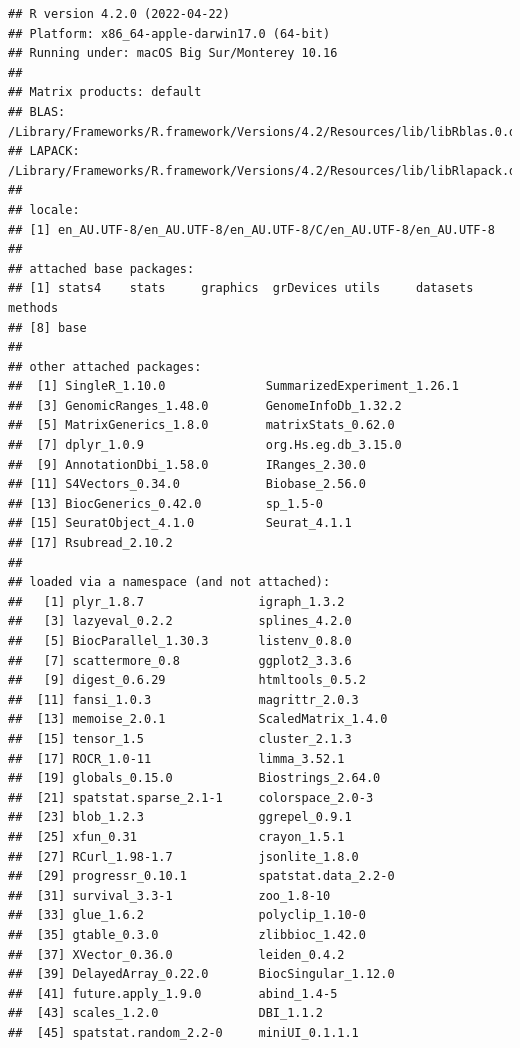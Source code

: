 \documentclass[
  openany]{book}
\begin{document}
\begin{verbatim}
## R version 4.2.0 (2022-04-22)
## Platform: x86_64-apple-darwin17.0 (64-bit)
## Running under: macOS Big Sur/Monterey 10.16
## 
## Matrix products: default
## BLAS:   /Library/Frameworks/R.framework/Versions/4.2/Resources/lib/libRblas.0.dylib
## LAPACK: /Library/Frameworks/R.framework/Versions/4.2/Resources/lib/libRlapack.dylib
## 
## locale:
## [1] en_AU.UTF-8/en_AU.UTF-8/en_AU.UTF-8/C/en_AU.UTF-8/en_AU.UTF-8
## 
## attached base packages:
## [1] stats4    stats     graphics  grDevices utils     datasets  methods  
## [8] base     
## 
## other attached packages:
##  [1] SingleR_1.10.0              SummarizedExperiment_1.26.1
##  [3] GenomicRanges_1.48.0        GenomeInfoDb_1.32.2        
##  [5] MatrixGenerics_1.8.0        matrixStats_0.62.0         
##  [7] dplyr_1.0.9                 org.Hs.eg.db_3.15.0        
##  [9] AnnotationDbi_1.58.0        IRanges_2.30.0             
## [11] S4Vectors_0.34.0            Biobase_2.56.0             
## [13] BiocGenerics_0.42.0         sp_1.5-0                   
## [15] SeuratObject_4.1.0          Seurat_4.1.1               
## [17] Rsubread_2.10.2            
## 
## loaded via a namespace (and not attached):
##   [1] plyr_1.8.7                igraph_1.3.2             
##   [3] lazyeval_0.2.2            splines_4.2.0            
##   [5] BiocParallel_1.30.3       listenv_0.8.0            
##   [7] scattermore_0.8           ggplot2_3.3.6            
##   [9] digest_0.6.29             htmltools_0.5.2          
##  [11] fansi_1.0.3               magrittr_2.0.3           
##  [13] memoise_2.0.1             ScaledMatrix_1.4.0       
##  [15] tensor_1.5                cluster_2.1.3            
##  [17] ROCR_1.0-11               limma_3.52.1             
##  [19] globals_0.15.0            Biostrings_2.64.0        
##  [21] spatstat.sparse_2.1-1     colorspace_2.0-3         
##  [23] blob_1.2.3                ggrepel_0.9.1            
##  [25] xfun_0.31                 crayon_1.5.1             
##  [27] RCurl_1.98-1.7            jsonlite_1.8.0           
##  [29] progressr_0.10.1          spatstat.data_2.2-0      
##  [31] survival_3.3-1            zoo_1.8-10               
##  [33] glue_1.6.2                polyclip_1.10-0          
##  [35] gtable_0.3.0              zlibbioc_1.42.0          
##  [37] XVector_0.36.0            leiden_0.4.2             
##  [39] DelayedArray_0.22.0       BiocSingular_1.12.0      
##  [41] future.apply_1.9.0        abind_1.4-5              
##  [43] scales_1.2.0              DBI_1.1.2                
##  [45] spatstat.random_2.2-0     miniUI_0.1.1.1           

\end{verbatim}
\end{document}
